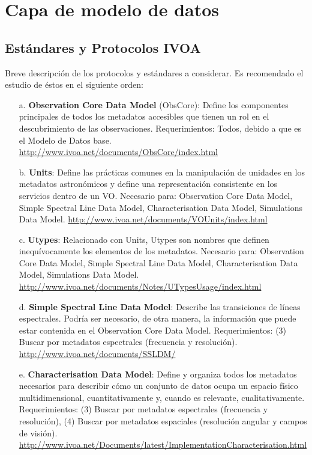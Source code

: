 \section{Capa de modelo de datos}
\subsection{Estándares y Protocolos IVOA}
Breve descripción de los protocolos y estándares a considerar. Es recomendado
el estudio de éstos en el siguiente orden:

\begin{enumerate}
	\item[a.] \textbf{Observation Core Data Model} (ObsCore): Define los componentes
principales de todos los metadatos accesibles que tienen un rol en el
descubrimiento de las observaciones. Requerimientos: Todos, debido a que es el
Modelo de Datos base. \url{http://www.ivoa.net/documents/ObsCore/index.html} 

	\item[b.] \textbf{Units}: Define las prácticas comunes en la
manipulación de unidades en los metadatos astronómicos y define una
representación consistente en los servicios dentro de un VO.
Necesario para: Observation Core Data Model, Simple Spectral Line Data Model,
Characterisation Data Model, Simulations Data Model.
\url{http://www.ivoa.net/documents/VOUnits/index.html}

	\item[c.] \textbf{Utypes}: Relacionado con Units, Utypes son nombres
que definen inequívocamente los elementos de los metadatos. Necesario para:
Observation Core Data Model, Simple Spectral Line Data Model, Characterisation
Data Model, Simulations Data Model.
\url{http://www.ivoa.net/documents/Notes/UTypesUsage/index.html}

	\item[d.] \textbf{Simple Spectral Line Data Model}: Describe las
transiciones de líneas espectrales. Podría ser necesario, de otra manera, la
información que puede estar contenida en el Observation Core Data Model.
Requerimientos: (3) Buscar por metadatos espectrales (frecuencia y resolución).
\url{http://www.ivoa.net/documents/SSLDM/}

	\item[e.] \textbf{Characterisation Data Model}: Define y organiza todos los
metadatos necesarios para describir cómo un conjunto de datos ocupa un espacio
físico multidimensional, cuantitativamente y, cuando es relevante,
cualitativamente. Requerimientos: (3) Buscar por metadatos espectrales
(frecuencia y resolución), (4) Buscar por metadatos espaciales (resolución
angular y campos de visión).
\url{http://www.ivoa.net/Documents/latest/ImplementationCharacterisation.html}


\end{enumerate}
